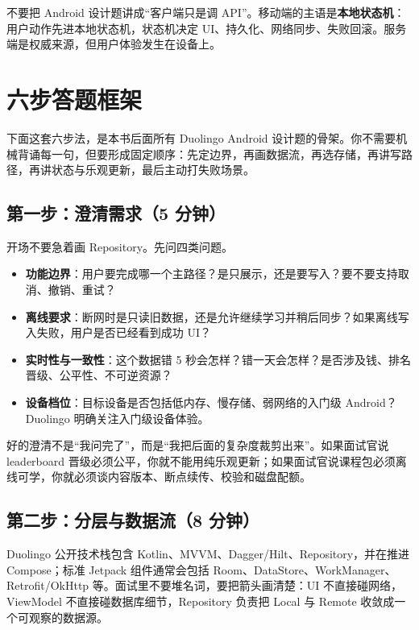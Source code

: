 \begin{idea}[移动端设计轮的主语]
不要把 Android 设计题讲成“客户端只是调 API”。移动端的主语是\textbf{本地状态机}：用户动作先进本地状态机，状态机决定 UI、持久化、网络同步、失败回滚。服务端是权威来源，但用户体验发生在设备上。
\end{idea}

\section{六步答题框架}

下面这套六步法，是本书后面所有 Duolingo Android 设计题的骨架。你不需要机械背诵每一句，但要形成固定顺序：先定边界，再画数据流，再选存储，再讲写路径，再讲状态与乐观更新，最后主动打失败场景。

\subsection{第一步：澄清需求（5 分钟）}

开场不要急着画 Repository。先问四类问题。

\begin{itemize}
  \item \textbf{功能边界}：用户要完成哪一个主路径？是只展示，还是要写入？要不要支持取消、撤销、重试？
  \item \textbf{离线要求}：断网时是只读旧数据，还是允许继续学习并稍后同步？如果离线写入失败，用户是否已经看到成功 UI？
  \item \textbf{实时性与一致性}：这个数据错 5 秒会怎样？错一天会怎样？是否涉及钱、排名晋级、公平性、不可逆资源？
  \item \textbf{设备档位}：目标设备是否包括低内存、慢存储、弱网络的入门级 Android？\srcofficial Duolingo 明确关注入门级设备体验。
\end{itemize}

好的澄清不是“我问完了”，而是“我把后面的复杂度裁剪出来”。如果面试官说 leaderboard 晋级必须公平，你就不能用纯乐观更新；如果面试官说课程包必须离线可学，你就必须谈内容版本、断点续传、校验和磁盘配额。

\subsection{第二步：分层与数据流（8 分钟）}

\srcofficial Duolingo 公开技术栈包含 Kotlin、MVVM、Dagger/Hilt、Repository，并在推进 Compose；\srcinferred 标准 Jetpack 组件通常会包括 Room、DataStore、WorkManager、Retrofit/OkHttp 等。面试里不要堆名词，要把箭头画清楚：UI 不直接碰网络，ViewModel 不直接碰数据库细节，Repository 负责把 Local 与 Remote 收敛成一个可观察的数据源。

